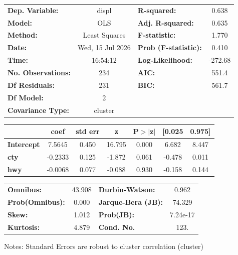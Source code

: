 \begin{center}
\begin{tabular}{lclc}
\toprule
\textbf{Dep. Variable:}    &      displ       & \textbf{  R-squared:         } &     0.638   \\
\textbf{Model:}            &       OLS        & \textbf{  Adj. R-squared:    } &     0.635   \\
\textbf{Method:}           &  Least Squares   & \textbf{  F-statistic:       } &     1.770   \\
\textbf{Date:}             & Wed, 15 Jul 2026 & \textbf{  Prob (F-statistic):} &    0.410    \\
\textbf{Time:}             &     16:54:12     & \textbf{  Log-Likelihood:    } &   -272.68   \\
\textbf{No. Observations:} &         234      & \textbf{  AIC:               } &     551.4   \\
\textbf{Df Residuals:}     &         231      & \textbf{  BIC:               } &     561.7   \\
\textbf{Df Model:}         &           2      & \textbf{                     } &             \\
\textbf{Covariance Type:}  &     cluster      & \textbf{                     } &             \\
\bottomrule
\end{tabular}
\begin{tabular}{lcccccc}
                   & \textbf{coef} & \textbf{std err} & \textbf{z} & \textbf{P$> |$z$|$} & \textbf{[0.025} & \textbf{0.975]}  \\
\midrule
\textbf{Intercept} &       7.5645  &        0.450     &    16.795  &         0.000        &        6.682    &        8.447     \\
\textbf{cty}       &      -0.2333  &        0.125     &    -1.872  &         0.061        &       -0.478    &        0.011     \\
\textbf{hwy}       &      -0.0068  &        0.077     &    -0.088  &         0.930        &       -0.158    &        0.144     \\
\bottomrule
\end{tabular}
\begin{tabular}{lclc}
\textbf{Omnibus:}       & 43.908 & \textbf{  Durbin-Watson:     } &    0.962  \\
\textbf{Prob(Omnibus):} &  0.000 & \textbf{  Jarque-Bera (JB):  } &   74.329  \\
\textbf{Skew:}          &  1.012 & \textbf{  Prob(JB):          } & 7.24e-17  \\
\textbf{Kurtosis:}      &  4.879 & \textbf{  Cond. No.          } &     123.  \\
\bottomrule
\end{tabular}
\end{center}

Notes: \newline
 [1] Standard Errors are robust to cluster correlation (cluster)